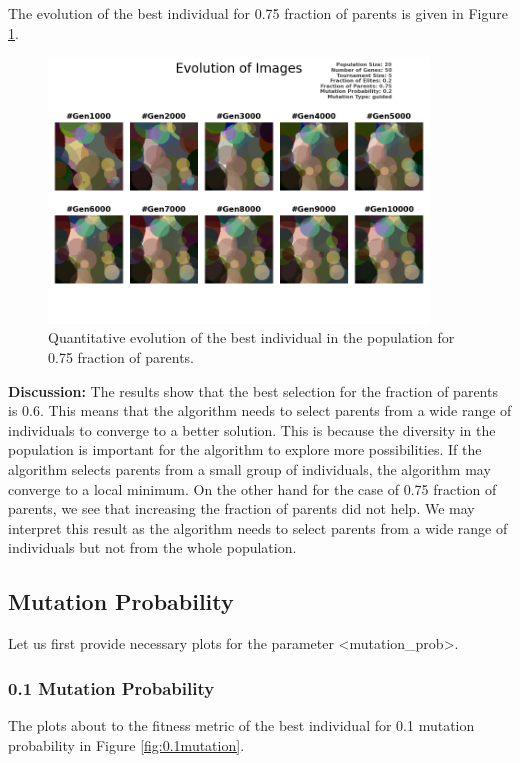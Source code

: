 \documentclass{assignment}
\begin{document}
The evolution of the best individual for 0.75 fraction of parents is given in Figure \ref{fig:0.75parents_image}.

\begin{figure}[!htb]
    \centering
    \includegraphics[width=0.9\textwidth]{figures/images_output_20_50_5_0.2_0.75_0.2_guided.png}
    \caption{Quantitative evolution of the best individual in the population for 0.75 fraction of parents.}
    \label{fig:0.75parents_image}
\end{figure}

\textbf{Discussion:} The results show that the best selection for the fraction of parents is 0.6. This means that the algorithm needs to select parents from a wide range of individuals to converge to a better solution. This is because the diversity in the population is important for the algorithm to explore more possibilities. If the algorithm selects parents from a small group of individuals, the algorithm may converge to a local minimum. On the other hand for the case of 0.75 fraction of parents, we see that increasing the fraction of parents did not help. We may interpret this result as the algorithm needs to select parents from a wide range of individuals but not from the whole population.


\subsection{Mutation Probability}
Let us first provide necessary plots for the parameter \textless{}mutation\_prob\textgreater{}.

\subsubsection{0.1 Mutation Probability}
The plots about to the fitness metric of the best individual for 0.1 mutation probability in Figure \ref{fig:0.1mutation}.
\end{document}
